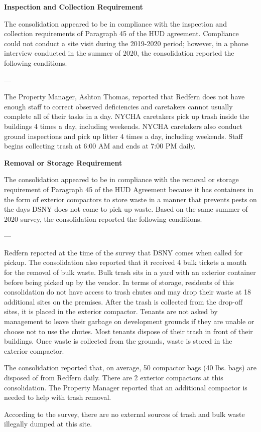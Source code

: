 

\textbf{Inspection and Collection Requirement} 

 

The consolidation appeared to be in compliance with the inspection and collection requirements of Paragraph 45 of the HUD agreement. Compliance could not conduct a site visit during the 2019-2020 period; however, in a phone interview conducted in the summer of 2020, the consolidation reported the following conditions.

--- 

The Property Manager, Ashton Thomas, reported that Redfern does not have enough staff to correct observed deficiencies and caretakers cannot usually complete all of their tasks in a day. NYCHA caretakers pick up trash inside the buildings 4 times a day, including weekends. NYCHA caretakers also conduct ground inspections and pick up litter 4 times a day, including weekends. Staff begins collecting trash at 6:00 AM and ends at 7:00 PM daily. 

\textbf{Removal or Storage Requirement} 

The consolidation appeared to be in compliance with the  removal or storage requirement of Paragraph  45 of the HUD Agreement because it has containers in the form of exterior compactors to store waste in a manner that prevents pests on the days DSNY does not come to pick up waste. Based on the same summer of  2020 survey, the consolidation reported the following conditions.

 

--- 

Redfern reported at the time of the survey that DSNY comes when called for pickup. The consolidation also reported that it received 4 bulk tickets a month for the removal of bulk waste. Bulk trash sits in a yard with an exterior container before being picked up by the vendor. In terms of storage, residents of this consolidation do not have access to trash chutes and may drop their waste at 18 additional sites on the premises. After the trash is collected from the drop-off sites, it is placed in the exterior compactor. Tenants are not asked by management to leave their garbage on development grounds if they are unable or choose not to use the chutes. Most tenants dispose of their trash in front of their buildings. Once waste is collected from the grounds, waste is stored in the exterior compactor.  

 

The consolidation reported that, on average, 50 compactor bags (40 lbs. bags) are disposed of from Redfern daily. There are 2 exterior compactors at this consolidation. The Property Manager reported that an additional compactor is needed to help with trash removal. 

According to the survey, there are no external sources of trash and bulk waste illegally dumped at this site.